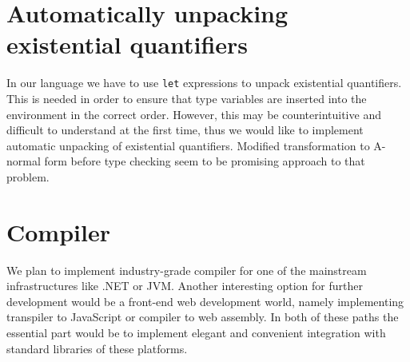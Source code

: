 \documentclass[declaration,shortabstract,english]{iithesis}
\begin{document}
\section{Automatically unpacking existential quantifiers}
In our language we have to use \verb+let+ expressions to unpack existential quantifiers.
This is needed in order to ensure that type variables are inserted into the environment in the correct order.
However, this may be counterintuitive and difficult to understand at the first time, thus
we would like to implement automatic unpacking of existential quantifiers.
Modified transformation to A-normal form before type checking seem to be promising approach to that problem.
\section{Compiler}
We plan to implement industry-grade compiler for one of the mainstream infrastructures like .NET or JVM.
Another interesting option for further development would be a front-end web development world,
namely implementing transpiler to JavaScript or compiler to web assembly.
In both of these paths the essential part would be to implement elegant and convenient integration
with standard libraries of these platforms.




\end{document}
